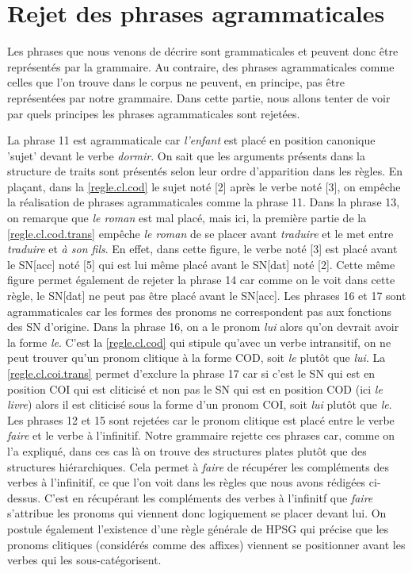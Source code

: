 \section{Rejet des phrases agrammaticales}

Les phrases que nous venons de décrire sont grammaticales et peuvent donc être représentés par la grammaire. Au contraire,
des phrases agrammaticales comme celles que l'on trouve dans le corpus ne peuvent, en principe, pas être représentées par notre
grammaire. Dans cette partie, nous allons tenter de voir par quels principes les phrases agrammaticales sont rejetées.

	La phrase 11 est agrammaticale car \emph{l'enfant} est placé en position canonique 'sujet' devant le verbe \emph{dormir}.
On sait que les arguments présents dans la structure de traits sont présentés selon leur ordre d'apparition dans les règles.
En plaçant, dans la \autoref{regle.cl.cod} le sujet noté [2] après le verbe noté [3], on empêche la réalisation de phrases
agrammaticales comme la phrase 11.
	Dans la phrase 13, on remarque que \emph{le roman} est mal placé, mais ici, la première partie de la
\autoref{regle.cl.cod.trans} empêche \emph{le roman} de se placer avant \emph{traduire} et le met entre \emph{traduire} et
\emph{à son fils}. En effet, dans cette figure, le verbe noté [3] est placé avant le SN[acc] noté [5] qui est lui même placé
avant le SN[dat] noté [2]. Cette même figure permet également de rejeter la phrase 14 car comme on le voit dans cette règle,
le SN[dat] ne peut pas être placé avant le SN[acc].
	Les phrases 16 et 17 sont agrammaticales car les formes des pronoms ne correspondent pas aux fonctions des SN d'origine.
Dans la phrase 16, on a le pronom \emph{lui} alors qu'on devrait avoir la forme \emph{le}. C'est la \autoref{regle.cl.cod}
qui stipule qu'avec un verbe intransitif, on ne peut trouver qu'un pronom clitique à la forme COD, soit \emph{le} plutôt que
\emph{lui}. La \autoref{regle.cl.coi.trans} permet d'exclure la phrase 17 car si c'est le SN qui est en position COI qui est
cliticisé et non pas le SN qui est en position COD (ici \emph{le livre}) alors il est cliticisé sous la forme d'un pronom COI,
soit \emph{lui} plutôt que \emph{le}.
	Les phrases 12 et 15 sont rejetées car le pronom clitique est placé entre le verbe \emph{faire} et le verbe à l'infinitif.
Notre grammaire rejette ces phrases car, comme on l'a expliqué, dans ces cas là on trouve des structures plates plutôt que des
structures hiérarchiques. Cela permet à \emph{faire} de récupérer les compléments des verbes à l'infinitif, ce que l'on voit
dans les règles que nous avons rédigées ci-dessus. C'est en récupérant les compléments des verbes à l'infinitf que \emph{faire}
s'attribue les pronoms qui viennent donc logiquement se placer devant lui. On postule également l'existence d'une règle
générale de HPSG qui précise que les pronoms clitiques (considérés comme des affixes) viennent se positionner avant les verbes
qui les sous-catégorisent.

